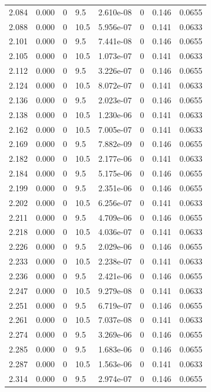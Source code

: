 \documentclass[preview]{standalone}
\begin{document}
{{{{{{{\begin{tabular}{L{1.2cm}C{1.2cm} C{0.3cm}C{0.5cm} C{1.4cm}C{1.4cm} C{1.4cm}C{1.4cm}}
  2.084  &  0.000  & 0     & 9.5 &  2.610e-08  & 0  & 0.146 &  0.0655   \\ 
  2.088  &  0.000  & 0     & 10.5 &  5.956e-07  & 0  & 0.141 &  0.0633   \\ 
  2.101  &  0.000  & 0     & 9.5 &  7.441e-08  & 0  & 0.146 &  0.0655   \\ 
  2.105  &  0.000  & 0     & 10.5 &  1.073e-07  & 0  & 0.141 &  0.0633   \\ 
  2.112  &  0.000  & 0     & 9.5 &  3.226e-07  & 0  & 0.146 &  0.0655   \\ 
  2.124  &  0.000  & 0     & 10.5 &  8.072e-07  & 0  & 0.141 &  0.0633   \\ 
  2.136  &  0.000  & 0     & 9.5 &  2.023e-07  & 0  & 0.146 &  0.0655   \\ 
  2.138  &  0.000  & 0     & 10.5 &  1.230e-06  & 0  & 0.141 &  0.0633   \\ 
  2.162  &  0.000  & 0     & 10.5 &  7.005e-07  & 0  & 0.141 &  0.0633   \\ 
  2.169  &  0.000  & 0     & 9.5 &  7.882e-09  & 0  & 0.146 &  0.0655   \\ 
  2.182  &  0.000  & 0     & 10.5 &  2.177e-06  & 0  & 0.141 &  0.0633   \\ 
  2.184  &  0.000  & 0     & 9.5 &  5.175e-06  & 0  & 0.146 &  0.0655   \\ 
  2.199  &  0.000  & 0     & 9.5 &  2.351e-06  & 0  & 0.146 &  0.0655   \\ 
  2.202  &  0.000  & 0     & 10.5 &  6.256e-07  & 0  & 0.141 &  0.0633   \\ 
  2.211  &  0.000  & 0     & 9.5 &  4.709e-06  & 0  & 0.146 &  0.0655   \\ 
  2.218  &  0.000  & 0     & 10.5 &  4.036e-07  & 0  & 0.141 &  0.0633   \\ 
  2.226  &  0.000  & 0     & 9.5 &  2.029e-06  & 0  & 0.146 &  0.0655   \\ 
  2.233  &  0.000  & 0     & 10.5 &  2.238e-07  & 0  & 0.141 &  0.0633   \\ 
  2.236  &  0.000  & 0     & 9.5 &  2.421e-06  & 0  & 0.146 &  0.0655   \\ 
  2.247  &  0.000  & 0     & 10.5 &  9.279e-08  & 0  & 0.141 &  0.0633   \\ 
  2.251  &  0.000  & 0     & 9.5 &  6.719e-07  & 0  & 0.146 &  0.0655   \\ 
  2.261  &  0.000  & 0     & 10.5 &  7.037e-08  & 0  & 0.141 &  0.0633   \\ 
  2.274  &  0.000  & 0     & 9.5 &  3.269e-06  & 0  & 0.146 &  0.0655   \\ 
  2.285  &  0.000  & 0     & 9.5 &  1.683e-06  & 0  & 0.146 &  0.0655   \\ 
  2.287  &  0.000  & 0     & 10.5 &  1.563e-06  & 0  & 0.141 &  0.0633   \\ 
  2.314  &  0.000  & 0     & 9.5 &  2.974e-07  & 0  & 0.146 &  0.0655   \\ 
\hline 
\end{tabular} 

}}}}}}}
\end{document}
